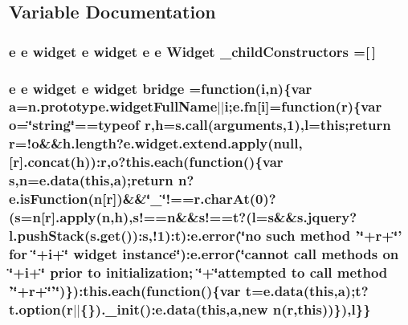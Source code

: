\subsection{Variable Documentation}
\hypertarget{static_2root_2js_2jquery-ui_8custom_8min_8js_a810998afde10a6b4e3f32418106272a9}{
\subsubsection[{\-\_\-child\-Constructors}]{ {\bf e} {\bf e} {\bf widget} {\bf e} {\bf widget} {\bf e} {\bf e} {\bf Widget} \-\_\-child\-Constructors =\mbox{[}$\,$\mbox{]}}}\label{static_2root_2js_2jquery-ui_8custom_8min_8js_a810998afde10a6b4e3f32418106272a9}
\hypertarget{static_2root_2js_2jquery-ui_8custom_8min_8js_a2ef040fbf477ac97e241201b0993989f}{
\subsubsection[{bridge}]{ {\bf e} {\bf e} {\bf widget} {\bf e} {\bf widget} bridge =function({\bf i},{\bf n})\{var {\bf a}=n.\-prototype.\-widget\-Full\-Name$\vert$$\vert${\bf i};{\bf e.\-fn}\mbox{[}{\bf i}\mbox{]}=function({\bf r})\{var {\bf o}=\char`\"{}string\char`\"{}==typeof {\bf r},{\bf h}={\bf s.\-call}(arguments,1),{\bf l}=this;return {\bf r}=!{\bf o}\&\&h.\-length?e.\-widget.\-extend.\-apply(null,\mbox{[}{\bf r}\mbox{]}.concat({\bf h}))\-:{\bf r},{\bf o}?{\bf this.\-each}(function()\{var {\bf s},{\bf n}={\bf e.\-data}(this,{\bf a});return {\bf n}?e.\-is\-Function({\bf n}\mbox{[}{\bf r}\mbox{]})\&\&\char`\"{}\-\_\-\char`\"{}!==r.\-char\-At(0)?({\bf s}={\bf n}\mbox{[}{\bf r}\mbox{]}.apply({\bf n},{\bf h}),s!=={\bf n}\&\&s!=={\bf t}?({\bf l}={\bf s}\&\&s.\-jquery?l.\-push\-Stack(s.\-get())\-:{\bf s},!1)\-:{\bf t})\-:{\bf e.\-error}(\char`\"{}no such method '\char`\"{}+r+\char`\"{}' for \char`\"{}+i+\char`\"{} widget instance\char`\"{})\-:e.\-error(\char`\"{}cannot {\bf call} methods {\bf on} \char`\"{}+i+\char`\"{} prior to initialization; \char`\"{}+\char`\"{}attempted to {\bf call} method '\char`\"{}+r+\char`\"{}'\char`\"{})\})\-:{\bf this.\-each}(function()\{var {\bf t}={\bf e.\-data}(this,{\bf a});{\bf t}?t.\-option({\bf r}$\vert$$\vert$\{\}).\-\_\-init()\-:{\bf e.\-data}(this,{\bf a},new {\bf n}({\bf r},this))\}),{\bf l}\}\}}}\label{static_2root_2js_2jquery-ui_8custom_8min_8js_a2ef040fbf477ac97e241201b0993989f}
